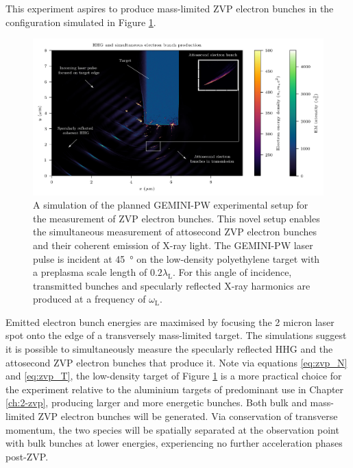 This experiment aspires to produce mass-limited ZVP electron bunches in the configuration simulated in Figure \ref{fig:experimentsetuphhgbunches2}. %
\begin{figure}
	\centering
	\includegraphics[width=1\linewidth]{figures/zvp/Experiment_setup_HHG_bunches2}
	\caption[Planned GEMINI-PW experimental setup for the measurement of ZVP electron bunches.]{A simulation of the planned GEMINI-PW experimental setup for the measurement of ZVP electron bunches. This novel setup enables the simultaneous measurement of attosecond ZVP electron bunches and their coherent emission of X-ray light. The GEMINI-PW laser pulse is incident at \qty{45}{\degree} on the low-density polyethylene target with a preplasma scale length of $0.2\lambda_\mathrm{L}$. For this angle of incidence, transmitted bunches and specularly reflected X-ray harmonics are produced at a frequency of $\omega_\mathrm{L}$.}
	\label{fig:experimentsetuphhgbunches2}
\end{figure}
Emitted electron bunch energies are maximised by focusing the 2 micron laser spot onto the edge of a transversely mass-limited target. The simulations suggest it is possible to simultaneously measure the specularly reflected \ac{HHG} and the attosecond ZVP electron bunches that produce it. Note via equations \ref{eq:zvp_N} and \ref{eq:zvp_T}, the low-density target of Figure \ref{fig:experimentsetuphhgbunches2} is a more practical choice for the experiment relative to the aluminium targets of predominant use in Chapter \ref{ch:2-zvp}, producing larger and more energetic bunches. Both bulk and mass-limited ZVP electron bunches will be generated. Via conservation of transverse momentum, the two species will be spatially separated at the observation point with bulk bunches at lower energies, experiencing no further acceleration phases post-ZVP.

